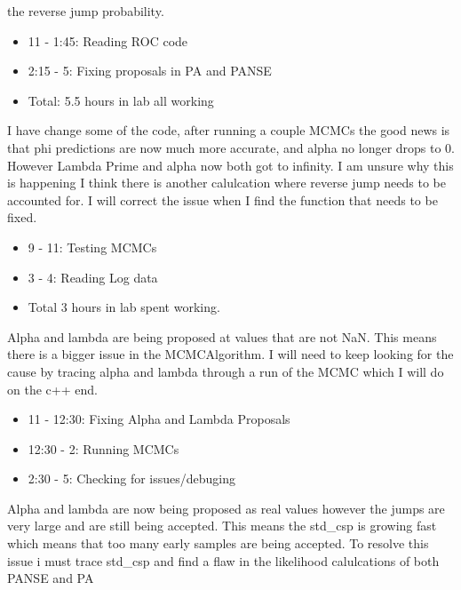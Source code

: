 \documentclass[12pt,hyperref]{labbook}
\begin{document}
the reverse jump probability.
\begin{itemize}
    \item 11 - 1:45: Reading ROC code
    \item 2:15 - 5: Fixing proposals in PA and PANSE
    \item Total: 5.5 hours in lab all working
\end{itemize}
I have change some of the code, after running a couple MCMCs the good news is that phi predictions are now much more accurate, and alpha no longer drops to 0. However Lambda Prime and alpha now both got to infinity. I am unsure why this is happening I think there is another calulcation where reverse jump needs to be accounted for. I will correct the issue when I find the function that needs to be fixed.
\begin{itemize}
    \item 9 - 11: Testing MCMCs
    \item 3 - 4: Reading Log data
    \item Total 3 hours in lab spent working.
\end{itemize}
Alpha and lambda are being proposed at values that are not NaN. This means there is a bigger issue in the MCMCAlgorithm. I will need to keep looking for the cause by tracing alpha and lambda through a run of the MCMC which I will do on the c++ end.
\begin{itemize}
    \item 11 - 12:30: Fixing Alpha and Lambda Proposals
    \item 12:30 - 2: Running MCMCs
    \item 2:30 - 5: Checking for issues/debuging
\end{itemize}
Alpha and lambda are now being proposed as real values however the jumps are very large and are still being accepted. This means the std_csp is growing fast which means that too many early samples are being accepted. To resolve this issue i must trace std_csp and find a flaw in the likelihood calulcations of both PANSE and PA
\end{document}
